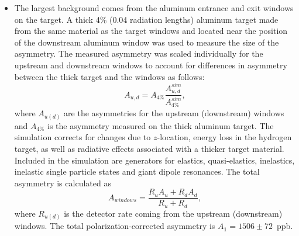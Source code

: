 \begin{itemize}
\item{The largest background comes from the aluminum entrance and exit windows on the target. A thick 4\% (0.04 radiation lengths) aluminum target made from the same material as the target windows and located near the position of the downstream aluminum window was used to measure the size of the asymmetry. The measured asymmetry was scaled individually for the upstream and downstream windows to account for differences in asymmetry between the thick target and the windows as follows:
\[
A_{u,d}=A_{4\%}\frac{A_{u,d}^{sim}}{A_{4\%}^{sim}},
\]
where $A_{u(d)}$ are the asymmetries for the upstream (downstream) windows and $A_{4\%}$ is the asymmetry measured on the thick aluminum target. The simulation corrects for changes due to $z$-location, energy loss in the hydrogen target, as well as radiative effects associated with a thicker target material. Included in the simulation are generators for elastics, quasi-elastics, inelastics, inelastic single particle states and giant dipole resonances. The total asymmetry is calculated as \
\[
A_{windows}=\frac{R_uA_u+R_dA_d}{R_u+R_d},
\]
where $R_{u(d)}$ is the detector rate coming from the upstream (downstream) windows. The total polarization-corrected asymmetry is $A_1=1506\pm 72$~ppb. 

}
\end{itemize}
